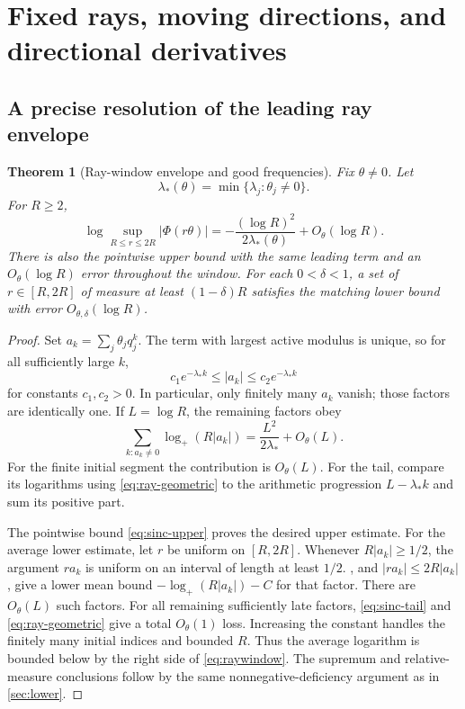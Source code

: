 \documentclass[11pt,a4paper]{article}
\numberwithin{equation}{section}
\newtheorem{theorem}{Theorem}[section]
\theoremstyle{definition}
\theoremstyle{remark}\newtheorem{remark}[theorem]{Remark}
\newcommand{\lp}{\log_+}
\begin{document}
\section{Fixed rays, moving directions, and directional derivatives}
\label{sec:rays}

\subsection{A precise resolution of the leading ray envelope}

\begin{theorem}[Ray-window envelope and good frequencies]
\label{thm:rays}
Fix $\theta\ne0$. Let
\begin{equation}
 \lambda_*(\theta)=\min\{\lambda_j:\theta_j\ne0\}.
 \label{eq:lambdastar}
\end{equation}
For $R\ge2$,
\begin{equation}
 \boxed{\log\sup_{R\le r\le2R}|\Phi(r\theta)|
    =-\frac{(\log R)^2}{2\lambda_*(\theta)}+O_\theta(\log R).}
 \label{eq:raywindow}
\end{equation}
There is also the pointwise upper bound with the same leading term and an
$O_\theta(\log R)$ error throughout the window. For each $0<\delta<1$, a set
of $r\in[R,2R]$ of measure at least $(1-\delta)R$ satisfies the matching
lower bound with error $O_{\theta,\delta}(\log R)$.
\end{theorem}
\begin{proof}
Set $a_k=\sum_j\theta_jq_j^k$. The term with largest active modulus is unique,
so for all sufficiently large $k$,
\begin{equation}
 c_1e^{-\lambda_*k}\le|a_k|\le c_2e^{-\lambda_*k}
 \label{eq:ray-geometric}
\end{equation}
for constants $c_1,c_2>0$. In particular, only finitely many $a_k$ vanish;
those factors are identically one. If $L=\log R$, the remaining factors obey
\begin{equation}
 \sum_{k:a_k\ne0}\lp(R|a_k|)=\frac{L^2}{2\lambda_*}+O_\theta(L).
 \label{eq:ray-denom}
\end{equation}
For the finite initial segment the contribution is $O_\theta(L)$.
For the tail, compare its logarithms using \eqref{eq:ray-geometric} to the
arithmetic progression $L-\lambda_*k$ and sum its positive part.

The pointwise bound \eqref{eq:sinc-upper} proves the desired upper estimate.
For the average lower estimate, let $r$ be uniform on $[R,2R]$. Whenever
$R|a_k|\ge1/2$, the argument $ra_k$ is uniform on an interval of length at
least $1/2$. , and $|ra_k|\le2R|a_k|$, give a lower
mean bound $-\lp(R|a_k|)-C$ for that factor. There are $O_\theta(L)$ such
factors. For all remaining sufficiently late factors, \eqref{eq:sinc-tail}
and \eqref{eq:ray-geometric} give a total $O_\theta(1)$ loss. Increasing the
constant handles the finitely many initial indices and bounded $R$.
Thus the average logarithm is bounded below by the right side of
\eqref{eq:raywindow}. The supremum and relative-measure conclusions follow
by the same nonnegative-deficiency argument as in \cref{sec:lower}.
\end{proof}
\end{document}
